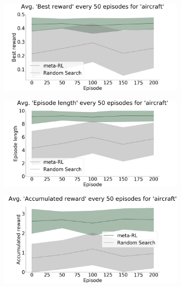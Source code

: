 \begin{figure}[ht]
\centering
\begin{subfigure}{.33\textwidth}
  \centering
      \includegraphics[width=\linewidth]{imgs/chained/average-best_reward-aircraft.png}
  \caption{}
  \label{fig:results:exp2:evolution:a}
\end{subfigure}%
\begin{subfigure}{.33\textwidth}
  \centering
      \includegraphics[width=\linewidth]{imgs/chained/average-ep_length-aircraft.png}
  \caption{}
  \label{fig:results:exp2:evolution:b}
\end{subfigure}%
\begin{subfigure}{.33\textwidth}
  \centering
      \includegraphics[width=\linewidth]{imgs/chained/average-acc_reward-aircraft.png}

\end{subfigure}
\end{figure}
